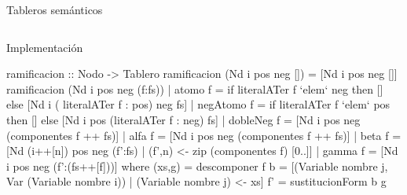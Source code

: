 \documentclass[final]{beamer}
\newlength{\onecolwid}
\newlength{\twocolwid}
\begin{document}
\begin{frame}[t,fragile]
\begin{columns}[t]
\begin{column}{\twocolwid}
\begin{columns}[t,totalwidth=\twocolwid]
\begin{column}{\onecolwid}
\begin{block}{Tableros semánticos}
    
  \end{block}


\end{column} %

\end{columns} %


\begin{alertblock}{Implementación}
  \begin{code}
ramificacion :: Nodo -> Tablero
ramificacion (Nd i pos neg []) = [Nd i pos neg []]
ramificacion (Nd i pos neg (f:fs)) 
  | atomo f    = if literalATer f `elem` neg
                 then []
                 else [Nd i ( literalATer f : pos) neg fs]
  | negAtomo f = if literalATer f `elem` pos
                 then []
                 else [Nd i pos (literalATer f : neg) fs]
  | dobleNeg f = [Nd i pos neg (componentes f ++ fs)]
  | alfa f     = [Nd i pos neg (componentes f ++ fs)]
  | beta f     = [Nd (i++[n]) pos neg (f':fs)
                 | (f',n) <- zip (componentes f) [0..]]
  | gamma f    = [Nd i pos neg (f':(fs++[f]))]
  where
    (xs,g) = descomponer f
    b      = [(Variable nombre j, Var (Variable nombre i)) 
             | (Variable nombre j) <- xs]
    f'     = sustitucionForm b g
  \end{code}
\end{alertblock} 

  


\begin{columns}[t,totalwidth=\twocolwid] %

\begin{column}{\onecolwid} %




\end{column} %


\begin{column}{\onecolwid} %



\end{column}
\end{columns}
\end{column}
\end{columns}
\end{frame}
\end{document}
